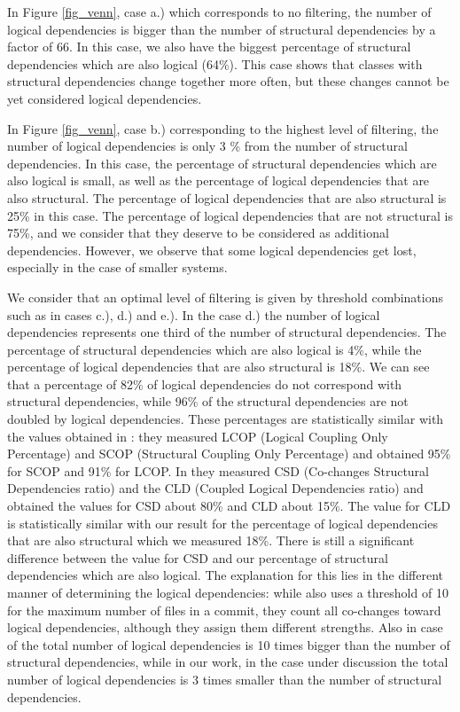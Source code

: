 \documentclass[a4paper,twoside]{article}
\begin{document}
In Figure \ref{fig_venn}, case a.) which corresponds to no filtering, the number of logical dependencies is bigger than the number of structural dependencies by a factor of 66. In this case, we also have the biggest percentage of structural dependencies which are also logical (64\%). This case shows that classes with structural dependencies change together more often, but these changes cannot be yet considered logical dependencies.

In Figure \ref{fig_venn}, case b.) corresponding to the highest level of filtering, the number of logical dependencies is only 3 \% from  the number of structural dependencies. In this case, the percentage of structural dependencies which are also logical is small, as well as the percentage of logical dependencies that are also structural.  The percentage of logical dependencies that are also structural is 25\% in this case. The percentage of logical dependencies that are not structural is 75\%, and we consider that they deserve to be considered as additional dependencies. However, we observe that some logical dependencies get lost, especially in the case of smaller systems.

We consider that an optimal level of filtering is given by threshold combinations such as in cases c.), d.) and e.).  In the case d.) the number of logical dependencies represents one third of the number of structural dependencies. The percentage of structural dependencies which are also logical is 4\%,  while the percentage of logical dependencies that are also structural is 18\%. We can see that a percentage of 82\% of logical dependencies do not correspond with  structural dependencies, while 96\% of the structural dependencies are not doubled by logical dependencies. These percentages are statistically similar with the values obtained in \cite{Oliva:2011:ISL:2067853.2068086}: they measured LCOP (Logical Coupling Only Percentage)  and SCOP (Structural Coupling Only Percentage) and obtained 95\% for SCOP and 91\% for LCOP. In \cite{DBLP:journals/jss/AjienkaC17} they  measured CSD (Co-changes Structural Dependencies ratio) and the CLD (Coupled Logical Dependencies ratio) and obtained the values for CSD about 80\% and CLD about 15\%. The value for CLD is statistically similar with our result for the percentage of logical dependencies that are also structural which we measured 18\%. There is still a significant difference between the value for CSD and our percentage of structural dependencies which are also logical. The explanation for this lies in the different manner of determining the logical dependencies: while \cite{DBLP:journals/jss/AjienkaC17} also uses a threshold of 10 for the maximum number of files in a commit, they count all co-changes toward logical dependencies, although they assign them different strengths. Also in case of \cite{DBLP:journals/jss/AjienkaC17}  the total number of logical dependencies is 10 times bigger than the number of structural dependencies, while in our work, in the case under discussion the total number of logical dependencies is 3 times smaller than the number of structural dependencies.  
\end{document}
